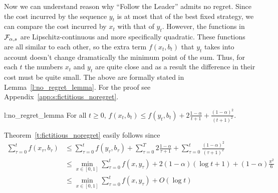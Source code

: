 Now we can understand reason why \enquote{Follow the Leader}
admits no regret. Since the cost incurred by the sequence $y_t$ is at most that
of the best fixed strategy, we can compare the cost incurred by $x_t$ with
that of $y_t$.  However, the functions in $\mathcal{F}_{\alpha,s}$ are
Lipschitz-continuous and more specifically quadratic.
These functions are all similar to each other, so the extra
term $f(x_t,b_t)$ that $y_t$ takes into account doesn't change
dramatically the minimum point of the sum. Thus, for each $t$ the
numbers $x_t$ and $y_t$ are quite close and as a result the
difference in their cost must be quite small. The above are
formally stated in Lemma~\ref{l:no_regret_lemma}. For the proof
see Appendix~\ref{app:s:fictitious_noregret}.
\begin{replemma}{l:no_regret_lemma}
  For all $t\geq 0$,
  \(
    f(x_t,b_t) \leq f(y_t,b_t) + 2\frac{1-\alpha}{t+1} +
    \frac{(1-\alpha)^2}{(t+1)^2}
  \).
\end{replemma}

Theorem~\ref{t:fictitious_noregret} easily follows since
\begin{align*}
  \sum_{\tau=0}^t f(x_\tau,b_\tau)
  &\leq
  \sum_{\tau=0}^t f(y_\tau,b_\tau) + \sum_{\tau=0}^T 2\frac{1-\alpha}{\tau+1} +
  \sum_{\tau=0}^t \frac{(1-\alpha)^2}{(\tau+1)^2}\\
  &\leq
  \min_{ x \in [0,1]} \sum_{\tau=0}^t f(x,y_\tau) +
  2(1-\alpha)(\log t + 1) + (1-\alpha)\frac{\pi^2}{6}\\
  &\leq
  \min_{ x \in [0,1]} \sum_{\tau=0}^t f(x,y_\tau) + O(\log t)
\end{align*}
